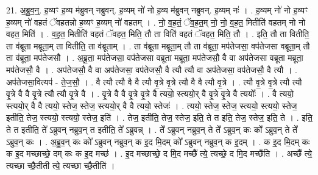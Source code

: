 \documentclass[17pt]{extarticle}
\begin{document}
21. अ॒ब्रु॒व॒न्॒. ह॒व्यꣳ ह॒व्य म॑ब्रुवन् नब्रुवन्. ह॒व्यम् नो॑ नो ह॒व्य म॑ब्रुवन् नब्रुवन्. ह॒व्यम् नः॑ । . ह॒व्यम् नो॑ नो ह॒व्यꣳ ह॒व्यम् नो॑ वहतं ॅवहतन्नो ह॒व्यꣳ ह॒व्यम् नो॑ वहतम् । . नो॒ व॒ह॒तं॒ ॅव॒ह॒त॒म् नो॒ नो॒ व॒ह॒त॒ मितीति॑ वहतम् नो नो वहत॒ मिति॑ । . व॒ह॒त॒ मितीति॑ वहतं ॅवहत॒ मिति॒ तौ ता विति॑ वहतं ॅवहत॒ मिति॒ तौ । . इति॒ तौ ता वितीति॒ ता व॑ब्रूता मब्रूता॒म् ता वितीति॒ ता व॑ब्रूताम् । . ता व॑ब्रूता मब्रूता॒म् तौ ता व॑ब्रूता॒ मप॑तेजसा॒ वप॑तेजसा वब्रूता॒म् तौ ता व॑ब्रूता॒ मप॑तेजसौ । . अ॒ब्रू॒ता॒ मप॑तेजसा॒ वप॑तेजसा वब्रूता मब्रूता॒ मप॑तेजसौ॒ वै वा अप॑तेजसा वब्रूता मब्रूता॒ मप॑तेजसौ॒ वै । . अप॑तेजसौ॒ वै वा अप॑तेजसा॒ वप॑तेजसौ॒ वै त्यौ त्यौ वा अप॑तेजसा॒ वप॑तेजसौ॒ वै त्यौ । . अप॑तेजसा॒वित्यप॑ - ते॒ज॒सौ॒ । . वै त्यौ त्यौ वै वै त्यौ वृ॒त्रे वृ॒त्रे त्यौ वै वै त्यौ वृ॒त्रे । . त्यौ वृ॒त्रे वृ॒त्रे त्यौ त्यौ वृ॒त्रे वै वै वृ॒त्रे त्यौ त्यौ वृ॒त्रे वै । . वृ॒त्रे वै वै वृ॒त्रे वृ॒त्रे वै त्ययो॒ स्त्ययो॒र् वै वृ॒त्रे वृ॒त्रे वै त्ययोः᳚ । . वै त्ययो॒ स्त्ययो॒र् वै वै त्ययो॒ स्तेज॒ स्तेज॒ स्त्ययो॒र् वै वै त्ययो॒ स्तेजः॑ । . त्ययो॒ स्तेज॒ स्तेज॒ स्त्ययो॒ स्त्ययो॒ स्तेज॒ इतीति॒ तेज॒ स्त्ययो॒ स्त्ययो॒ स्तेज॒ इति॑ । . तेज॒ इतीति॒ तेज॒ स्तेज॒ इति॒ ते त इति॒ तेज॒ स्तेज॒ इति॒ ते । . इति॒ ते त इतीति॒ ते᳚ ऽब्रुवन् नब्रुव॒न् त इतीति॒ ते᳚ ऽब्रुवन्न् । . ते᳚ ऽब्रुवन् नब्रुव॒न् ते ते᳚ ऽब्रुव॒न् कः को᳚ ऽब्रुव॒न् ते ते᳚ ऽब्रुव॒न् कः । . अ॒ब्रु॒व॒न् कः को᳚ ऽब्रुवन् नब्रुव॒न् क इ॒द मि॒दम् को᳚ ऽब्रुवन् नब्रुव॒न् क इ॒दम् । . क इ॒द मि॒दम् कः क इ॒द मच्छाच्छे॒ दम् कः क इ॒द मच्छ॑ । . इ॒द मच्छाच्छे॒ द मि॒द मच्छै᳚ त्ये॒ त्यच्छे॒ द मि॒द मच्छै॑ति । . अच्छै᳚ त्ये॒ त्यच्छा च्छै॒तीती त्ये॒ त्यच्छा च्छै॒तीति॑ । \newline
\end{document}
